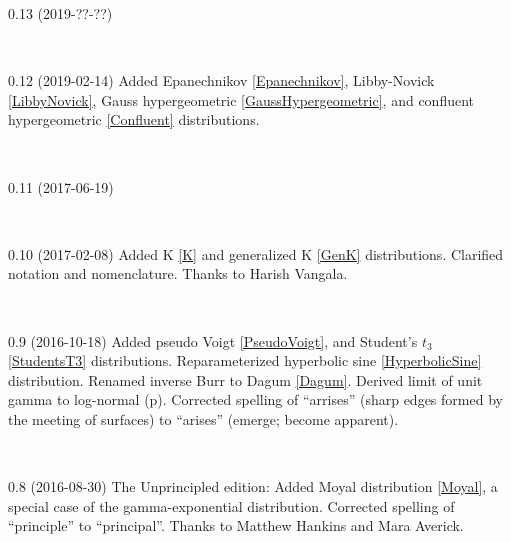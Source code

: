 {
\small \tightstretch

0.13 (2019-??-??)

~

0.12 (2019-02-14) 
Added
Epanechnikov \eqref{Epanechnikov}, 
Libby-Novick \eqref{LibbyNovick},
Gauss hypergeometric \eqref{GaussHypergeometric},
and
confluent hypergeometric \eqref{Confluent}
distributions. 

~

0.11 (2017-06-19)

~

0.10 (2017-02-08)
Added K \eqref{K}  and generalized K  \eqref{GenK} distributions.
Clarified notation and nomenclature.
Thanks to Harish Vangala.

~

0.9 (2016-10-18)
Added 
	pseudo Voigt \eqref{PseudoVoigt}, 
and
	Student's $t_3$ \eqref{StudentsT3}
distributions.
Reparameterized hyperbolic sine \eqref{HyperbolicSine} distribution.
Renamed inverse Burr to Dagum \eqref{Dagum}. %
Derived limit of unit gamma to log-normal (p\pageref{UnitGammaToLogNormal}). 
Corrected spelling of  ``arrises'' (sharp edges formed by the meeting of surfaces) to ``arises'' (emerge; become apparent). 

~

0.8 (2016-08-30)
The Unprincipled edition:
Added Moyal distribution \eqref{Moyal}, a special case of the gamma-exponential distribution.
Corrected spelling of ``principle'' to ``principal''. Thanks to Matthew Hankins and Mara Averick.

}
